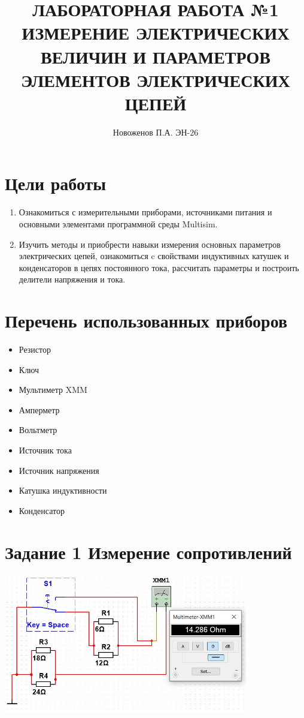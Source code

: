 \documentclass[14pt, a4paper]{article}
\title{ЛАБОРАТОРНАЯ РАБОТА №1
ИЗМЕРЕНИЕ ЭЛЕКТРИЧЕСКИХ ВЕЛИЧИН И ПАРАМЕТРОВ
ЭЛЕМЕНТОВ ЭЛЕКТРИЧЕСКИХ ЦЕПЕЙ
}
\author{Новоженов П.А. ЭН-26}
\date{}
\begin{document}
    \maketitle

    \thispagestyle{empty}

    \clearpage

    \section*{Цели работы}

    \begin{enumerate}
    \item Ознакомиться с измерительными приборами, 
    источниками питания и основными элементами 
    программной среды Multisim.
    \item  Изучить методы и приобрести навыки 
    измерения основных параметров электрических цепей, 
    ознакомиться c свойствами индуктивных катушек и
    конденсаторов в цепях постоянного тока, рассчитать параметры и построить делители напряжения и тока.
    \end{enumerate}

    \section*{Перечень использованных приборов}
    \begin{itemize}
        \item Резистор
        \item Ключ 
        \item Мультиметр XMM
        \item Амперметр
        \item Вольтметр
        \item Источник тока
        \item Источник напряжения
        \item Катушка индуктивности
        \item Конденсатор
    \end{itemize}

    \clearpage

    \section*{Задание 1 Измерение сопротивлений}

    {
        \includegraphics[width=0.8\textwidth]{1lab1.1.jpg}
        \centering
    }
\end{document}
